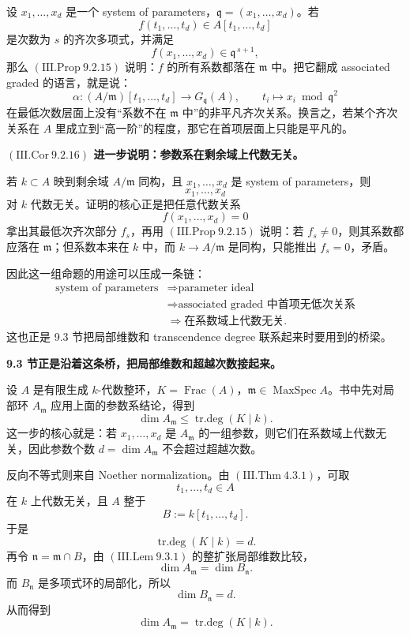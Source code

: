 \documentclass[a4paper]{ctexart}
\theoremstyle{definition}
\theoremstyle{analysis}
\theoremstyle{plain}
\begin{document}
设 \(x_1,\dots,x_d\) 是一个 system of parameters，\(\mathfrak q=(x_1,\dots,x_d)\)。若
\[
  f(t_1,\dots,t_d)\in A[t_1,\dots,t_d]
\]
是次数为 \(s\) 的齐次多项式，并满足
\[
  f(x_1,\dots,x_d)\in \mathfrak q^{\,s+1},
\]
那么 \((\mathrm{III.Prop}\ 9.2.15)\) 说明：\(f\) 的所有系数都落在 \(\mathfrak m\) 中。把它翻成 associated graded 的语言，就是说：
\[
  \alpha:(A/\mathfrak m)[t_1,\dots,t_d]\longrightarrow G_{\mathfrak q}(A),
  \qquad
  t_i\mapsto x_i \bmod \mathfrak q^2
\]
在最低次数层面上没有“系数不在 \(\mathfrak m\) 中”的非平凡齐次关系。换言之，若某个齐次关系在 \(A\) 里成立到“高一阶”的程度，那它在首项层面上只能是平凡的。

\medskip

\textbf{\((\mathrm{III.Cor}\ 9.2.16)\) 进一步说明：参数系在剩余域上代数无关。}

若 \(k\subset A\) 映到剩余域 \(A/\mathfrak m\) 同构，且 \(x_1,\dots,x_d\) 是 system of parameters，则
\[
  x_1,\dots,x_d
\]
对 \(k\) 代数无关。证明的核心正是把任意代数关系
\[
  f(x_1,\dots,x_d)=0
\]
拿出其最低次齐次部分 \(f_s\)，再用 \((\mathrm{III.Prop}\ 9.2.15)\) 说明：若 \(f_s\neq 0\)，则其系数都应落在 \(\mathfrak m\)；但系数本来在 \(k\) 中，而 \(k\to A/\mathfrak m\) 是同构，只能推出 \(f_s=0\)，矛盾。

因此这一组命题的用途可以压成一条链：
\[
  \begin{aligned}
    \text{system of parameters}
    &\Longrightarrow
    \text{parameter ideal} \\
    &\Longrightarrow
    \text{associated graded 中首项无低次关系} \\
    &\Longrightarrow
    \text{在系数域上代数无关}.
  \end{aligned}
\]
这也正是 9.3 节把局部维数和 transcendence degree 联系起来时要用到的桥梁。

\medskip

\textbf{9.3 节正是沿着这条桥，把局部维数和超越次数接起来。}

设 \(A\) 是有限生成 \(k\)-代数整环，\(K=\operatorname{Frac}(A)\)，\(\mathfrak m\in \operatorname{MaxSpec}A\)。书中先对局部环 \(A_{\mathfrak m}\) 应用上面的参数系结论，得到
\[
  \dim A_{\mathfrak m}\le \operatorname{tr.deg}(K\mid k).
\]
这一步的核心就是：若 \(x_1,\dots,x_d\) 是 \(A_{\mathfrak m}\) 的一组参数，则它们在系数域上代数无关，因此参数个数 \(d=\dim A_{\mathfrak m}\) 不会超过超越次数。

\medskip

反向不等式则来自 Noether normalization。由 \((\mathrm{III.Thm}\ 4.3.1)\)，可取
\[
  t_1,\dots,t_d\in A
\]
在 \(k\) 上代数无关，且 \(A\) 整于
\[
  B:=k[t_1,\dots,t_d].
\]
于是
\[
  \operatorname{tr.deg}(K\mid k)=d.
\]
再令 \(\mathfrak n=\mathfrak m\cap B\)，由 \((\mathrm{III.Lem}\ 9.3.1)\) 的整扩张局部维数比较，
\[
  \dim A_{\mathfrak m}=\dim B_{\mathfrak n}.
\]
而 \(B_{\mathfrak n}\) 是多项式环的局部化，所以
\[
  \dim B_{\mathfrak n}=d.
\]
从而得到
\[
  \dim A_{\mathfrak m}=\operatorname{tr.deg}(K\mid k).
\]
\end{document}
